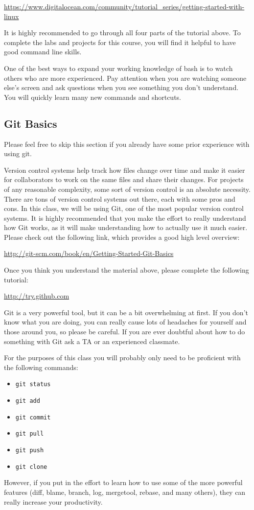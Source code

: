 \documentclass[11pt]{article}
\begin{document}
\url{https://www.digitalocean.com/community/tutorial_series/getting-started-with-linux}

It is highly recommended to go through all four parts of the tutorial above. To complete the labs and projects for this course, you will find it helpful to have good command line skills.

One of the best ways to expand your working knowledge of bash is to watch others who are more experienced. Pay attention when you are watching someone else's screen and ask questions when you see something you don't understand. You will quickly learn many new commands and shortcuts.

\subsection{Git Basics}
Please feel free to skip this section if you already have some prior experience with using git.

Version control systems help track how files change over time and make it easier for collaborators to work on the same files and share their changes. For projects of any reasonable complexity, some sort of version control is an absolute necessity. There are tons of version control systems out there, each with some pros and cons. In this class, we will be using Git, one of the most popular version control systems. It is highly recommended that you make the effort to really understand how Git works, as it will make understanding how to actually use it much easier. Please check out the following link, which provides a good high level overview:

\url{http://git-scm.com/book/en/Getting-Started-Git-Basics}

Once you think you understand the material above, please complete the following tutorial:

\url{http://try.github.com}

Git is a very powerful tool, but it can be a bit overwhelming at first. If you don't know what you are doing, you can really cause lots of headaches for yourself and those around you, so please be careful. If you are ever doubtful about how to do something with Git ask a TA or an experienced classmate.

For the purposes of this class you will probably only need to be proficient with the following commands:
\begin{itemize}
\item {\tt git status}
\item {\tt git add}
\item {\tt git commit}
\item {\tt git pull}
\item {\tt git push}
\item {\tt git clone}
\end{itemize}
However, if you put in the effort to learn how to use some of the more powerful features (diff, blame, branch, log, mergetool, rebase, and many others), they can really increase your productivity.
\end{document}
